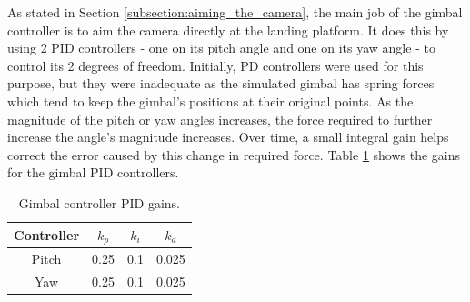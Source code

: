 \label{section:gimbal_controller_results}

As stated in Section \ref{subsection:aiming_the_camera}, the main job of the gimbal controller is to aim the camera directly at the landing platform. It does this by using 2 PID controllers - one on its pitch angle and one on its yaw angle - to control its 2 degrees of freedom. Initially, PD controllers were used for this purpose, but they were inadequate as the simulated gimbal has spring forces which tend to keep the gimbal's positions at their original points. As the magnitude of the pitch or yaw angles increases, the force required to further increase the angle's magnitude increases. Over time, a small integral gain helps correct the error caused by this change in required force. Table \ref{tab:gimbal_controller_pid_gains} shows the gains for the gimbal PID controllers.

\begin{table}[ht]
    \centering
    \begin{tabular}{|c|c|c|c|}
    \hline
        Controller & $k_p$ & $k_i$ & $k_d$ \\\hline
        Pitch & 0.25 & 0.1 & 0.025 \\\hline
        Yaw & 0.25 & 0.1 & 0.025 \\\hline
    \end{tabular}
    \caption{Gimbal controller PID gains.}
    \label{tab:gimbal_controller_pid_gains}
\end{table}

